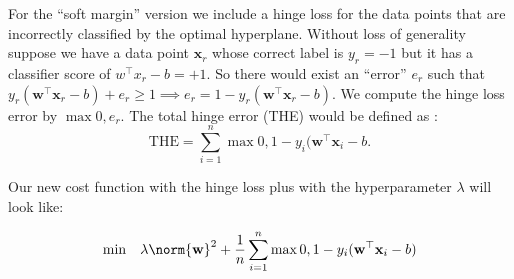 \documentclass[12pt]{article}
\newcommand{\snmath}{\displaystyle\sum_{i=1}^n}
\begin{document}
\begin{enumerate}
\begin{tcolorbox}[colback=white, sharp corners]
For the ``soft margin'' version we include a hinge loss for the data points that are incorrectly classified by the optimal hyperplane. Without loss of generality suppose we have a data point $\mathbf{x}_r$ whose correct label is $y_r = -1$ but it has a classifier score of $w^\top x_r -b = +1$. So there would exist an ``error'' $e_r$ such that $y_r(\mathbf{w}^\top \mathbf{x}_r - b) + e_{r} \geq 1 \implies e_r = 1 - y_r(\mathbf{w}^\top \mathbf{x}_r - b)$. We compute the hinge loss error by $\max{0, e_r}$. The total hinge error (THE) would be defined as :
\[
\mathrm{THE} = \snmath \max{0, 1 - y_i(\mathbf{w}^\top \mathbf{x}_i - b}.
\]

Our new cost function with the hinge loss plus with the hyperparameter $\lambda$ will look like: 

\[
	\mathrm{min} \quad \lambda \norm{\mathbf{w}}^2 +  \dfrac{1}{n} \snmath \max{0, 1 - y_i(\mathbf{w}^\top \mathbf{x}_i - b)}
\]


\end{tcolorbox}

\end{enumerate}

\newpage
\end{document}
